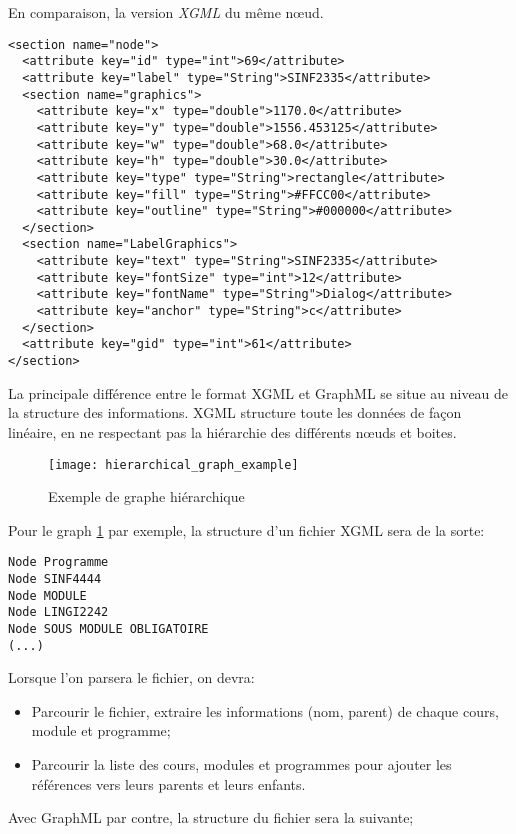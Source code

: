 En comparaison, la version \textit{XGML} du même nœud.
\begin{lstlisting}
<section name="node">
  <attribute key="id" type="int">69</attribute>
  <attribute key="label" type="String">SINF2335</attribute>
  <section name="graphics">
    <attribute key="x" type="double">1170.0</attribute>
    <attribute key="y" type="double">1556.453125</attribute>
    <attribute key="w" type="double">68.0</attribute>
    <attribute key="h" type="double">30.0</attribute>
    <attribute key="type" type="String">rectangle</attribute>
    <attribute key="fill" type="String">#FFCC00</attribute>
    <attribute key="outline" type="String">#000000</attribute>
  </section>
  <section name="LabelGraphics">
    <attribute key="text" type="String">SINF2335</attribute>
    <attribute key="fontSize" type="int">12</attribute>
    <attribute key="fontName" type="String">Dialog</attribute>
    <attribute key="anchor" type="String">c</attribute>
  </section>
  <attribute key="gid" type="int">61</attribute>
</section>
\end{lstlisting}

La principale différence entre le format XGML et GraphML se situe au niveau de la structure des informations. XGML structure toute les données de façon linéaire, en ne respectant pas la hiérarchie des différents nœuds et boites.

\begin{figure}
\centering
\caption{Exemple de graphe hiérarchique} 
\label{fig:hierarchical_graph_example}
\texttt{[image: hierarchical\_graph\_example]}
\end{figure}

Pour le graph \ref{fig:hierarchical_graph_example} par exemple, la structure d'un fichier XGML sera de la sorte:
\begin{lstlisting}
Node Programme
Node SINF4444
Node MODULE
Node LINGI2242
Node SOUS MODULE OBLIGATOIRE
(...)
\end{lstlisting}

Lorsque l'on parsera le fichier, on devra:
\begin{itemize}
  \item Parcourir le fichier, extraire les informations (nom, parent) de chaque cours, module et programme;
  \item Parcourir la liste des cours, modules et programmes pour ajouter les références vers leurs parents et leurs enfants.
\end{itemize} 

Avec GraphML par contre, la structure  du fichier sera la suivante;

